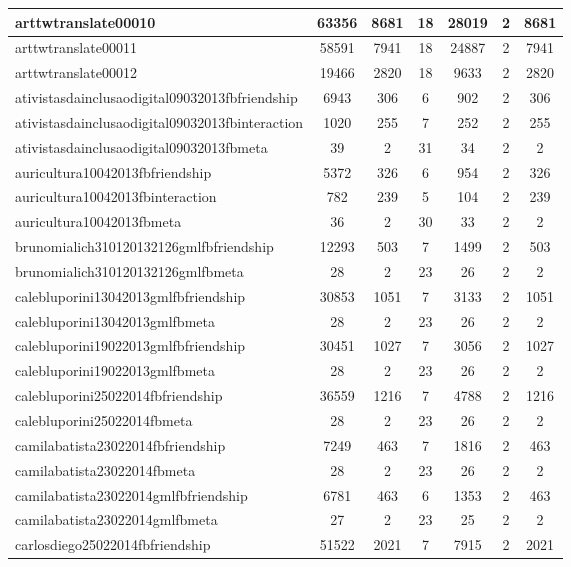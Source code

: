 \begin{table*}[h!]
\begin{center}
\begin{tabular}{| l | c | c | c | c | c | c |}
arttwtranslate00010 & 63356  & 8681  & 18  & 28019  & 2  & 8681 \\\hline
arttwtranslate00011 & 58591  & 7941  & 18  & 24887  & 2  & 7941 \\\hline
arttwtranslate00012 & 19466  & 2820  & 18  & 9633  & 2  & 2820 \\\hline
ativistasdainclusaodigital09032013fbfriendship & 6943  & 306  & 6  & 902  & 2  & 306 \\\hline
ativistasdainclusaodigital09032013fbinteraction & 1020  & 255  & 7  & 252  & 2  & 255 \\\hline
ativistasdainclusaodigital09032013fbmeta & 39  & 2  & 31  & 34  & 2  & 2 \\\hline
auricultura10042013fbfriendship & 5372  & 326  & 6  & 954  & 2  & 326 \\\hline
auricultura10042013fbinteraction & 782  & 239  & 5  & 104  & 2  & 239 \\\hline
auricultura10042013fbmeta & 36  & 2  & 30  & 33  & 2  & 2 \\\hline
brunomialich310120132126gmlfbfriendship & 12293  & 503  & 7  & 1499  & 2  & 503 \\\hline
brunomialich310120132126gmlfbmeta & 28  & 2  & 23  & 26  & 2  & 2 \\\hline
calebluporini13042013gmlfbfriendship & 30853  & 1051  & 7  & 3133  & 2  & 1051 \\\hline
calebluporini13042013gmlfbmeta & 28  & 2  & 23  & 26  & 2  & 2 \\\hline
calebluporini19022013gmlfbfriendship & 30451  & 1027  & 7  & 3056  & 2  & 1027 \\\hline
calebluporini19022013gmlfbmeta & 28  & 2  & 23  & 26  & 2  & 2 \\\hline
calebluporini25022014fbfriendship & 36559  & 1216  & 7  & 4788  & 2  & 1216 \\\hline
calebluporini25022014fbmeta & 28  & 2  & 23  & 26  & 2  & 2 \\\hline
camilabatista23022014fbfriendship & 7249  & 463  & 7  & 1816  & 2  & 463 \\\hline
camilabatista23022014fbmeta & 28  & 2  & 23  & 26  & 2  & 2 \\\hline
camilabatista23022014gmlfbfriendship & 6781  & 463  & 6  & 1353  & 2  & 463 \\\hline
camilabatista23022014gmlfbmeta & 27  & 2  & 23  & 25  & 2  & 2 \\\hline
carlosdiego25022014fbfriendship & 51522  & 2021  & 7  & 7915  & 2  & 2021 \\\hline

\end{tabular}
\end{center}
\end{table*}
